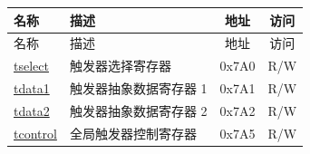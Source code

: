 
\begin{longtable}{ | p{4.0cm} | p{8.4cm} | c | c| }
\hline\rowcolor{lightgray}
名称 & 描述 & 地址 & 访问 \\ \hline
\endfirsthead
\hline
\rowcolor{lightgray}
名称 & 描述 & 地址 & 访问  \\
\hline
\endhead
\endfoot

\hyperref[regdesc:TSELECT]{tselect} & 触发器选择寄存器 & 0x7A0 & R/W \\\hline
\hyperref[regdesc:TDATA1]{tdata1} & 触发器抽象数据寄存器 1 & 0x7A1 & R/W \\\hline
\hyperref[regdesc:TDATA2]{tdata2} & 触发器抽象数据寄存器 2 & 0x7A2 & R/W \\\hline
\hyperref[regdesc:TCONTROL]{tcontrol} & 全局触发器控制寄存器 & 0x7A5 & R/W \\\hline

\end{longtable}
